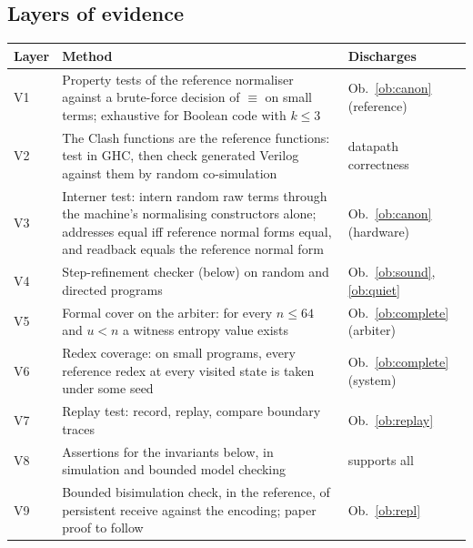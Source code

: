 \documentclass[11pt]{article}
\newcommand{\scong}{\equiv}
\theoremstyle{definition}
\theoremstyle{remark}
\begin{document}
\subsection{Layers of evidence}

\noindent
\begin{tabularx}{\textwidth}{@{}l X X@{}}
\toprule
Layer & Method & Discharges\\
\midrule
V1 & Property tests of the reference normaliser against a brute-force
     decision of $\scong$ on small terms; exhaustive for Boolean code with
     $k \le 3$ & Ob.~\ref{ob:canon} (reference)\\
V2 & The Clash functions are the reference functions: test in GHC, then
     check generated Verilog against them by random co-simulation
     & datapath correctness\\
V3 & Interner test: intern random raw terms through the machine's normalising
     constructors alone; addresses equal iff reference normal forms equal,
     and readback equals the reference normal form & Ob.~\ref{ob:canon} (hardware)\\
V4 & Step-refinement checker (below) on random and directed programs
     & Ob.~\ref{ob:sound}, \ref{ob:quiet}\\
V5 & Formal cover on the arbiter: for every $n \le 64$ and $u<n$ a
     witness entropy value exists & Ob.~\ref{ob:complete} (arbiter)\\
V6 & Redex coverage: on small programs, every reference redex at every
     visited state is taken under some seed & Ob.~\ref{ob:complete} (system)\\
V7 & Replay test: record, replay, compare boundary traces
     & Ob.~\ref{ob:replay}\\
V8 & Assertions for the invariants below, in simulation and bounded
     model checking & supports all\\
V9 & Bounded bisimulation check, in the reference, of persistent receive
     against the encoding; paper proof to follow & Ob.~\ref{ob:repl}\\
\bottomrule
\end{tabularx}
\end{document}
